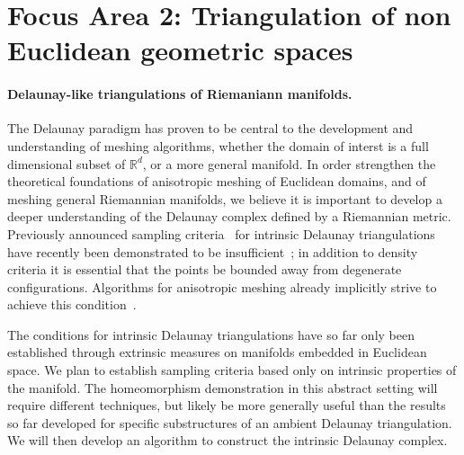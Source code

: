 %

\newcommand{\man}{\mathcal{M}}
\newcommand{\reel}{\mathbb{R}}
\newcommand{\rdee}{\reel^d}
\renewcommand{\pts}{P}
\newcommand{\mesh}{\hat{M}}

\newcommand{\ramsay}[1]{\rred{[[#1]]}}

\section*{Focus Area 2: Triangulation of non Euclidean geometric spaces}

\paragraph{Delaunay-like triangulations of Riemaniann manifolds.}

The Delaunay paradigm has proven to be central to the development and
understanding of meshing algorithms, whether the domain of interst is
a full dimensional subset of $\rdee$, or a more general manifold. In
order strengthen the theoretical foundations of anisotropic meshing of
Euclidean domains, and of meshing general Riemannian manifolds, we
believe it is important to develop a deeper understanding of the
Delaunay complex defined by a Riemannian metric. %
%
Previously announced sampling criteria~\cite{leibon2000} for intrinsic
Delaunay triangulations have recently been demonstrated to be
insufficient~\cite{boissonnat2012stab}; in addition to density
criteria it is essential that the points be bounded away from
degenerate configurations. Algorithms for anisotropic meshing already
implicitly strive to achieve this condition~\cite{bwy-luam-08}.

The conditions for intrinsic Delaunay triangulations have so far only
been established through extrinsic measures on manifolds embedded in
Euclidean space. We plan to establish sampling criteria based only on
intrinsic properties of the manifold. The homeomorphism demonstration
in this abstract setting will require different techniques, but likely
be more generally useful than the results so far developed for
specific substructures of an ambient Delaunay triangulation.  We will
then develop an algorithm to construct the intrinsic Delaunay complex.

